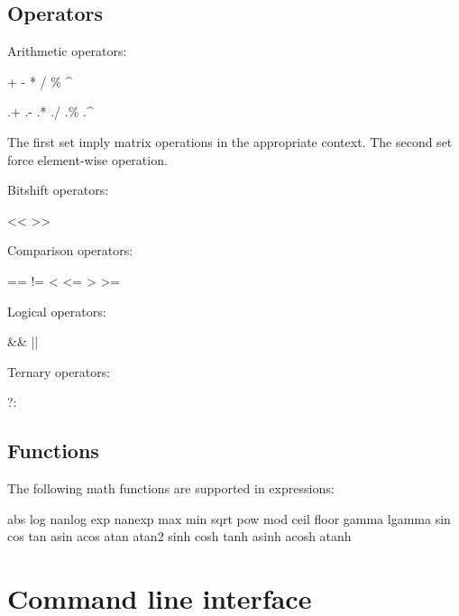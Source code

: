 \subsection{Operators\label{Operators}}

Arithmetic operators:

{\sf + - * / \% \^{}}

{\sf .+ .- .* ./ .\% .\^{}}

The first set imply matrix operations in the appropriate context. The second
set force element-wise operation.

Bitshift operators:

{\sf << >>}

Comparison operators:

{\sf == != < <= > >= }

Logical operators:

{\sf \&\& ||}

Ternary operators:

{\sf ?:}

\subsection{Functions\label{Functions}}

The following math functions are supported in expressions:

{\sf abs log nanlog exp nanexp max min sqrt pow mod ceil floor gamma lgamma
  sin cos tan asin acos atan atan2 sinh cosh tanh asinh acosh atanh}

\section{Command line interface\label{Command_line_interface}}

